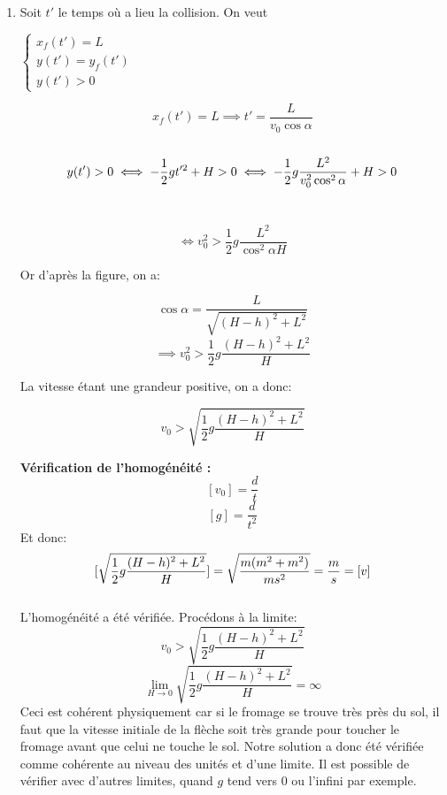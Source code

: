 \documentclass[a4paper,10pt,twoside]{article}
\begin{document}
\begin{enumerate}
    \item Soit $t'$ le temps où a lieu la collision. On veut 
    \begin{center}
        $\begin{cases}
             x_f(t')=L \\
             y(t')=y_f(t') \\
             y(t')>0
        \end{cases}$
    \end{center} 
    \textbullet \[x_f(t')=L \implies t'=\dfrac{L}{v_0 \cos{\alpha}}\]
    \\
    \textbullet \[ y(t')>0 \\
    \iff -\frac{1}{2} gt'^2 +H >0 \\
    \iff -\frac{1}{2} g \dfrac{L^2}{v_0^2 \cos^2{\alpha}} +H >0 \] \\
    \begin{center}
    \[ \iff  v_0^2 >\frac{1}{2} g \dfrac{L^2}{\cos^2{\alpha}H} \]
        
    \end{center}
    Or d'après la figure, on a:
    \begin{center}
       \[ \cos{\alpha}= \dfrac{L}{\sqrt{(H-h)^2+ L^2}} \]
    \[ \implies 
    v_0^2 >\frac{1}{2} g \dfrac{(H-h)^2+ L^2}{H}\]
    \end{center}
    La vitesse étant une grandeur positive, on a donc:
    \begin{center}
        \[v_0 >\sqrt{\frac{1}{2} g \dfrac{(H-h)^2+ L^2}{H}}  \]
    \end{center}
     \textbf{Vérification de l'homogénéité :} \\
    \[[v_0]=\frac{d}{t} \] 
    \[ [g]=\dfrac{d}{t^2} \] 
    Et donc: 
    \[ [\sqrt{\frac{1}{2} g \dfrac{(H-h)^2+ L^2}{H}}]=\sqrt{\dfrac{m(m^2+ m^2)}{ms^2}}\\
    =\frac{m}{s} =[v] \] \\
    L'homogénéité a été vérifiée. Procédons à la limite: 
    \[ v_0 > \sqrt{\frac{1}{2} g \dfrac{(H-h)^2+ L^2}{H} }\]
    \[ \lim_{H\to 0} \sqrt{\frac{1}{2} g \dfrac{(H-h)^2+ L^2}{H}} =\infty \]
    Ceci est cohérent physiquement car si le fromage se trouve très près du sol, il faut que la vitesse initiale de la flèche soit très grande pour toucher le fromage avant que celui ne touche le sol. Notre solution a donc été vérifiée comme cohérente au niveau des unités et d'une limite. Il est possible de vérifier avec d'autres limites, quand $g$ tend vers 0 ou l'infini par exemple. 
    \end{enumerate}
    
\end{document}
